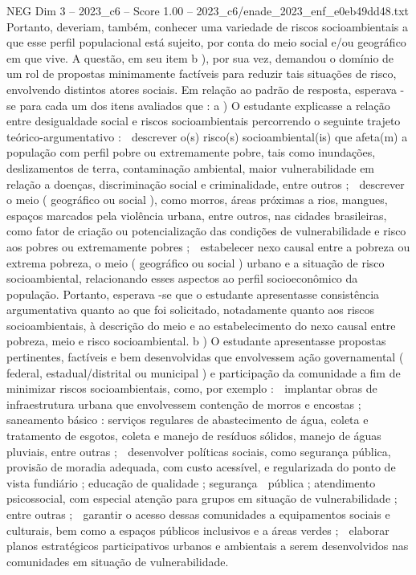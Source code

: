 \begin{textsample}{NEG Dim 3 – 2023\_c6 – Score 1.00 – 2023\_c6/enade\_2023\_enf\_e0eb49dd48.txt}
Portanto, deveriam, também, conhecer uma variedade de riscos socioambientais a que esse perfil populacional está sujeito, por conta do meio social e/ou geográfico em que vive.
A questão, em seu item b ), por sua vez, demandou o domínio de um rol de propostas minimamente factíveis para reduzir tais situações de risco, envolvendo distintos atores sociais.
Em relação ao padrão de resposta, esperava -se para cada um dos itens avaliados que : a ) O estudante explicasse a relação entre desigualdade social e riscos socioambientais percorrendo o seguinte trajeto teórico-argumentativo :  descrever o(s) risco(s) socioambiental(is) que afeta(m) a população com perfil pobre ou extremamente pobre, tais como inundações, deslizamentos de terra, contaminação ambiental, maior vulnerabilidade em relação a doenças, discriminação social e criminalidade, entre outros ;  descrever o meio ( geográfico ou social ), como morros, áreas próximas a rios, mangues, espaços marcados pela violência urbana, entre outros, nas cidades brasileiras, como fator de criação ou potencialização das condições de vulnerabilidade e risco aos pobres ou extremamente pobres ;  estabelecer nexo causal entre a pobreza ou extrema pobreza, o meio ( geográfico ou social ) urbano e a situação de risco socioambiental, relacionando esses aspectos ao perfil socioeconômico da população.
Portanto, esperava -se que o estudante apresentasse consistência argumentativa quanto ao que foi solicitado, notadamente quanto aos riscos socioambientais, à descrição do meio e ao estabelecimento do nexo causal entre pobreza, meio e risco socioambiental. b ) O estudante apresentasse propostas pertinentes, factíveis e bem desenvolvidas que envolvessem ação governamental ( federal, estadual/distrital ou municipal ) e participação da comunidade a fim de minimizar riscos socioambientais, como, por exemplo :  implantar obras de infraestrutura urbana que envolvessem contenção de morros e encostas ; saneamento básico : serviços regulares de abastecimento de água, coleta e tratamento de esgotos, coleta e manejo de resíduos sólidos, manejo de águas pluviais, entre outras ;  desenvolver políticas sociais, como segurança pública, provisão de moradia adequada, com custo acessível, e regularizada do ponto de vista fundiário ; educação de qualidade ; segurança  pública ; atendimento psicossocial, com especial atenção para grupos em situação de vulnerabilidade ; entre outras ;  garantir o acesso dessas comunidades a equipamentos sociais e culturais, bem como a espaços públicos inclusivos e a áreas verdes ;  elaborar planos estratégicos participativos urbanos e ambientais a serem desenvolvidos nas comunidades em situação de vulnerabilidade.

\end{textsample}

